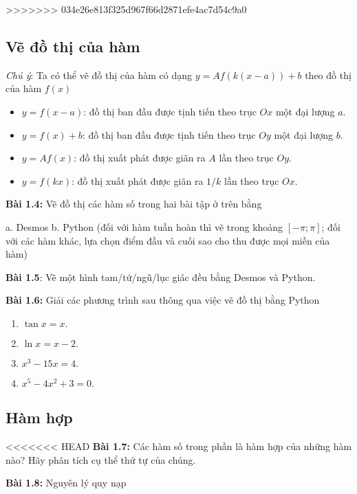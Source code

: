 >>>>>>> 034e26e813f325d967f66d2871efe4ac7d54c9a0
\subsection*{Vẽ đồ thị của hàm}
\emph{Chú ý}: Ta có thể vẽ đồ thị của hàm có dạng $y=Af(k(x-a))+b$ theo đồ thị của hàm $f(x)$
\begin{itemize}
    \item $y=f(x-a)$: đồ thị ban đầu được tịnh tiến theo trục $Ox$ một đại lượng $a$.
    \item $y=f(x)+b$: đồ thị ban đầu được tịnh tiến theo trục $Oy$ một đại lượng $b$.
    \item $y=Af(x)$: đồ thị xuất phát được giãn ra $A$ lần theo trục $Oy$.
    \item $y=f(kx)$: đồ thị xuất phát được giãn ra $1/k$ lần theo trục $Ox$.
\end{itemize}
\textbf{Bài 1.4:} Vẽ đồ thị các hàm số trong hai bài tập ở trên bằng

a. Desmos 
\vspace{5pt}
b. Python (đối với hàm tuần hoàn thì vẽ trong khoảng $[-\pi;\pi]$; đối với các hàm khác, lựa chọn điểm đầu và cuối sao cho thu được mọi miền của hàm)
\vspace{5pt}

\textbf{Bài 1.5}: Vẽ một hình tam/tứ/ngũ/lục giác đều bằng Desmos và Python.
\vspace{5pt}

\textbf{Bài 1.6:} Giải các phương trình sau thông qua việc vẽ đồ thị bằng Python
\begin{enumerate}[label=(\alph*)]
    \item $\tan x= x.$
    \item $\ln x = x-2.$
    \item $x^3 -15x =4.$
    \item $x^5 -4x^2 +3=0.$
\end{enumerate}
\subsection*{Hàm hợp}
<<<<<<< HEAD
\textbf{Bài 1.7:} Các hàm số trong phần là hàm hợp của những hàm nào? Hãy phân tích cụ thể thứ tự của chúng.
\vspace{5pt}

\textbf{Bài 1.8:} Nguyên lý quy nạp\newline

